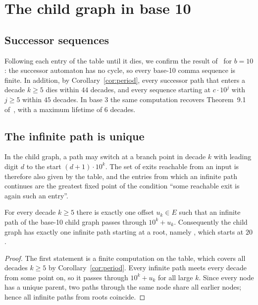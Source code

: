 \section{The child graph in base 10}
\label{sec:consequences}

\subsection{Successor sequences}

Following each entry of the table until it dies, we confirm the result of~\cite{dbts} for $b = 10$:
the successor automaton has no cycle, so every base-10 comma sequence is finite. In addition, by
Corollary~\ref{cor:period}, every successor path that enters a decade $k \ge 5$ dies within $44$
decades, and every sequence starting at $c \cdot 10^j$ with $j \ge 5$ within $45$ decades. In base 3
the same computation recovers Theorem~9.1 of~\cite{comma}, with a maximum lifetime of $6$ decades.

\subsection{The infinite path is unique}

In the child graph, a path may switch at a branch point in decade $k$ with leading digit $d$ to the
start $(d + 1) \cdot 10^k$. The set of exits reachable from an input is therefore also given by the
table, and the entries from which an infinite path continues are the greatest fixed point of the
condition ``some reachable exit is again such an entry''.

\begin{theorem}
  \label{thm:unique}
  For every decade $k \ge 5$ there is exactly one offset $u_k \in E$ such that an infinite path of
  the base-10 child graph passes through $10^k + u_k$. Consequently the child graph has exactly one
  infinite path starting at a root, namely , which starts at $20$.
\end{theorem}

\begin{proof}
  The first statement is a finite computation on the table, which covers all decades $k \ge 5$ by
  Corollary~\ref{cor:period}. Every infinite path meets every decade from some point on, so it
  passes through $10^k + u_k$ for all large $k$. Since every node has a
  unique parent, two paths through the same node share all earlier nodes; hence all infinite paths
  from roots coincide.
\end{proof}

